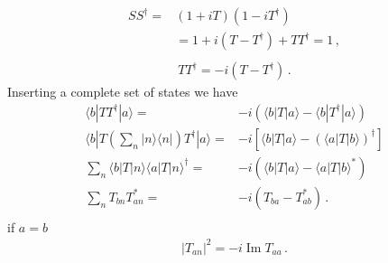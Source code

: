\begin{align}
  S S^\dagger=&(1+i T)(1-i T^\dagger)\nonumber\\
  &=1+i(T-T^\dagger)+T T^\dagger=1\,,\nonumber\\
\end{align}
\begin{align}
  T T^\dagger=-i(T-T^\dagger)\,.
\end{align}
Inserting a complete set of states we have
\begin{align}
  \langle b|T T^\dagger|a\rangle=&-i(\langle b|T|a\rangle-\langle b|T^\dagger|a\rangle)\nonumber\\
\langle b|T\left(\sum_n|n\rangle\langle n|\right)T^\dagger|a\rangle=&-i\left[\langle b|T|a\rangle-\left(\langle a|T|b\rangle\right)^\dagger\right]\nonumber\\
\sum_n\langle b|T|n\rangle\langle a|T|n\rangle^\dagger=&-i\left(\langle b|T|a\rangle-\langle a|T|b\rangle^*\right)\nonumber\\
\sum_n T_{bn}T_{an}^*=&-i\left(T_{ba}-T_{ab}^*\right)\,.\nonumber\\
\end{align}
if $a=b$
\begin{align}
  |T_{an}|^2=-i\operatorname{Im}T_{aa} \,.
\end{align}

